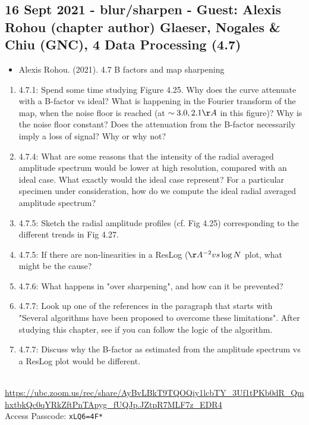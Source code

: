 \documentclass[11pt, oneside]{article}   	%
\begin{document}
\subsection{16 Sept 2021 - blur/sharpen - Guest: Alexis Rohou (chapter author) Glaeser, Nogales \& Chiu (GNC), 4 Data Processing (4.7)}
\begin{itemize}
	\item Alexis Rohou. (2021). 4.7 B factors and map sharpening 
\end{itemize}
\begin{enumerate}
	\item 4.7.1: Spend some time studying Figure 4.25. Why does the curve attenuate with a B-factor vs ideal? What is happening in the Fourier transform of the map, when the noise floor is reached (at $\sim 3.0,2.1 \AA$ in this figure)? Why is the noise floor constant? Does the attenuation from the B-factor necessarily imply a loss of signal? Why or why not?
	\item 4.7.4: What are some reasons that the intensity of the radial averaged amplitude spectrum would be lower at high resolution, compared with an ideal case. What exactly would the ideal case represent? For a particular specimen under consideration, how do we compute the ideal radial averaged amplitude spectrum?
	\item 4.7.5: Sketch the radial amplitude profiles (cf. Fig 4.25) corresponding to the different trends in Fig 4.27.
	\item 4.7.5: If there are non-linearities in a ResLog ($\AA^{-2} vs \log N$ plot, what might be the cause?
	\item 4.7.6: What happens in "over sharpening", and how can it be prevented?
	\item 4.7.7: Look up one of the references in the paragraph that starts with "Several algorithms have been proposed to overcome these limitations". After studying this chapter, see if you can follow the logic of the algorithm.
	\item 4.7.7: Discuss why the B-factor as estimated from the amplitude spectrum vs a ResLog plot would be different.
\end{enumerate}
 \\
{\tiny \url{https://ubc.zoom.us/rec/share/AyBvLBkT9TQOQiy1lcbTY_3Uf1tPKb0dR_QmhxtbkQc0qYRkZftPnTApyg_fUQJp.JZtpR7MLF7z_EDR4}} \\
Access Passcode: \texttt{xLQ6=4F*}
\end{document}
